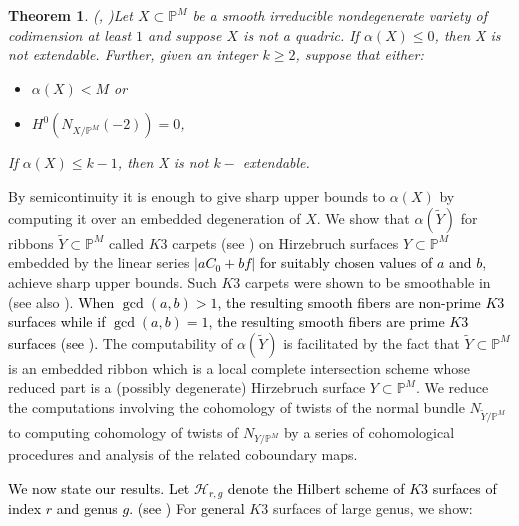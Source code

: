 \documentclass[11pt,twoside]{amsart}
\theoremstyle{plain}
\numberwithin{equation}{section}
\newtheorem{theorem}{Theorem}[section]
\theoremstyle{definition}
\begin{document}
\begin{theorem}(\cite{Lvo92}, \cite{Zak91})\label{ZL}
Let $X \subset \mathbb{P}^{M}$ be a smooth irreducible nondegenerate variety of codimension at least $1$ and suppose $X$ is not a quadric. If $\alpha(X) \leq 0$, then X is not extendable. Further, given an integer $k \geq 2$, suppose that either:
\begin{itemize}
    \item[(1)] $\alpha(X) < M$ or
    \item[(2)] $H^0(N_{X/\mathbb{P}^M}(-2)) = 0$,
\end{itemize}
If $\alpha(X) \leq k-1$, then X is not $k-$ extendable.  

\end{theorem}

By semicontinuity it is enough to give sharp upper bounds to $\alpha(X)$ by computing it over an embedded degeneration of $X$. We show that $\alpha(\widetilde{Y})$ for ribbons $\widetilde{Y} \subset \mathbb{P}^M$ called $K3$ carpets (see ) on Hirzebruch surfaces $Y \subset \mathbb{P}^M$ embedded by the linear series \textcolor{black}{$|aC_0+bf|$ for suitably chosen values of $a$ and $b$}, achieve sharp upper bounds. Such $K3$ carpets were shown to be smoothable in \cite{BMR21} (see also \cite{GP97}).  \textcolor{black}{When $\operatorname{gcd}(a,b) > 1$, the resulting smooth fibers are non-prime $K3$ surfaces while if $\operatorname{gcd}(a,b) = 1$, the resulting smooth fibers are prime $K3$ surfaces (see ).} The computability of $\alpha(\widetilde{Y})$ is facilitated by the fact that $\widetilde{Y} \subset \mathbb{P}^M$ is an embedded ribbon which is a local complete intersection scheme whose reduced part is a (possibly degenerate) Hirzebruch surface $Y \subset \mathbb{P}^M$. %
We reduce the computations involving the cohomology of twists of the normal bundle $N_{\widetilde{Y}/\mathbb{P}^M}$ to computing cohomology of twists of $N_{Y/\mathbb{P}^M}$ by a series of cohomological procedures and analysis of the related coboundary maps. \par


\textcolor{black}{We now state our results. Let $\mathcal{H}_{r,g}$ denote the Hilbert scheme of $K3$ surfaces of index $r$ and genus $g$. (see )}
For \textcolor{black}{general} $K3$ surfaces of large genus, we show:
\end{document}
